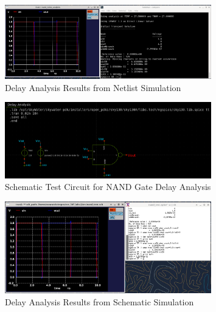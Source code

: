 \documentclass{article}
\begin{document}
	\begin{figure}[H]
		\centerline{\includegraphics[width=0.8\textwidth]{nand_delay_analysis.png}}
		\caption{Delay Analysis Results from Netlist Simulation}
		\label{fig::nand_delay_analysis}
	\end{figure}
	
	\begin{figure}[H]
		\centerline{\includegraphics[width=0.8\textwidth]{nand_delay_analysis_test_circuit.png}}
		\caption{Schematic Test Circuit for NAND Gate Delay Analysis}
		\label{fig::nand_delay_analysis_test_circuit_schem}
	\end{figure}
	
	\begin{figure}[H]
		\centerline{\includegraphics[width=0.8\textwidth]{nand_delay_analysis_schem.png}}
		\caption{Delay Analysis Results from Schematic Simulation}
		\label{fig::nand_delay_analysis_schem}
	\end{figure}
	
\end{document}
